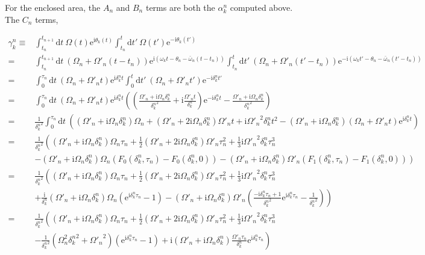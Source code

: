 \documentclass[10pt,fleqn]{article}
\newcommand{\ud}{\mathrm{d}}
\newcommand{\ue}{\mathrm{e}}
\newcommand{\ui}{\mathrm{i}}
\newcommand{\eqar}[1]
{
  \begin{align*}
    #1
  \end{align*}
}
\newcommand{\paren}[1]{{\left({#1}\right)}}
\newcommand{\lparen}[1]{{\left({#1}\right.}}
\newcommand{\rparen}[1]{{\left.{#1}\right)}}
\begin{document}
For the enclosed area, the $A_n$ and $B_n$ terms are both the $\alpha_k^n$
computed above. The $C_n$ terms,
\eqar{
  \gamma_k^n\equiv&\int_{t_{n}}^{t_{n+1}}\!\!\ud t\ \Omega(t)\ue^{\ui\theta_k(t)}\int_{t_n}^{t}\!\!\ud t'\ \Omega(t')\ue^{-\ui\theta_k(t')}\\
  =&\int_{t_{n}}^{t_{n+1}}\!\!\ud t\ \paren{\Omega_n+\Omega'_n\paren{t-t_n}}\ue^{\ui\paren{\omega_kt-\theta_n-\bar\omega_n\paren{t-t_n}}}\int_{t_n}^{t}\!\!\ud t'\ \paren{\Omega_n+\Omega'_n\paren{t'-t_n}}\ue^{-\ui\paren{\omega_kt'-\theta_n-\bar\omega_n\paren{t'-t_n}}}\\
  =&\int_{0}^{\tau_n}\!\!\ud t\ \paren{\Omega_n+\Omega'_nt}\ue^{\ui\delta_k^nt}\int_{0}^{t}\!\!\ud t'\ \paren{\Omega_n+\Omega'_nt'}\ue^{-\ui\delta_k^nt'}\\
  =&\int_{0}^{\tau_n}\!\!\ud t\ \paren{\Omega_n+\Omega'_nt}\ue^{\ui\delta_k^nt}
  \paren{\paren{\frac{\Omega'_n+\ui\Omega_n\delta_k^n}{{\delta_k^n}^2}+\ui\frac{\Omega'_nt}{\delta_k^n}}\ue^{-\ui\delta_k^nt}-\frac{\Omega'_n+\ui\Omega_n\delta_k^n}{{\delta_k^n}^2}}\\
  =&\frac{1}{{\delta_k^n}^2}\int_{0}^{\tau_n}\!\!\ud t
  \ \paren{
    \paren{\Omega'_n+\ui\Omega_n\delta_k^n}\Omega_n
    +\paren{\Omega'_n+2\ui\Omega_n\delta_k^n}\Omega'_nt
    +\ui{\Omega'_n}^2\delta_k^nt^2
    -\paren{\Omega'_n+\ui\Omega_n\delta_k^n}\paren{\Omega_n+\Omega'_nt}
    \ue^{\ui\delta_k^nt}}\\
  =&\frac{1}{{\delta_k^n}^2}
  \lparen{\paren{\Omega'_n+\ui\Omega_n\delta_k^n}\Omega_n\tau_n+\frac{1}{2}\paren{\Omega'_n+2\ui\Omega_n\delta_k^n}\Omega'_n\tau_n^2+\frac{1}{3}\ui{\Omega'_n}^2\delta_k^n\tau_n^3}\\
  &\rparen{-\paren{\Omega'_n+\ui\Omega_n\delta_k^n}\Omega_n\paren{F_0(\delta_k^n, \tau_n)-F_0(\delta_k^n, 0)}-\paren{\Omega'_n+\ui\Omega_n\delta_k^n}\Omega'_n\paren{F_1(\delta_k^n, \tau_n)-F_1(\delta_k^n, 0)}}\\
  =&\frac{1}{{\delta_k^n}^2}
  \lparen{\paren{\Omega'_n+\ui\Omega_n\delta_k^n}\Omega_n\tau_n+\frac{1}{2}\paren{\Omega'_n+2\ui\Omega_n\delta_k^n}\Omega'_n\tau_n^2+\frac{1}{3}\ui{\Omega'_n}^2\delta_k^n\tau_n^3}\\
  &\rparen{+\frac{\ui}{{\delta_k^n}}\paren{\Omega'_n+\ui\Omega_n\delta_k^n}\Omega_n
    \paren{\ue^{\ui{\delta_k^n}\tau_n}-1}
    -\paren{\Omega'_n+\ui\Omega_n\delta_k^n}\Omega'_n
    \paren{\frac{-\ui{\delta_k^n}\tau_n + 1}{{\delta_k^n}^2}\ue^{\ui{\delta_k^n}\tau_n}
      -\frac{1}{{\delta_k^n}^2}}}\\
  =&\frac{1}{{\delta_k^n}^2}
  \lparen{\paren{\Omega'_n+\ui\Omega_n\delta_k^n}\Omega_n\tau_n+\frac{1}{2}\paren{\Omega'_n+2\ui\Omega_n\delta_k^n}\Omega'_n\tau_n^2+\frac{1}{3}\ui{\Omega'_n}^2\delta_k^n\tau_n^3}\\
  &\rparen{-\frac{1}{{\delta_k^n}^2}\paren{\Omega_n^2{\delta_k^n}^2+{\Omega'_n}^2}
    \paren{\ue^{\ui{\delta_k^n}\tau_n}-1}
    +\ui\paren{\Omega'_n+\ui\Omega_n\delta_k^n}
    \frac{\Omega'_n\tau_n}{{\delta_k^n}}\ue^{\ui{\delta_k^n}\tau_n}
  }
}
\end{document}
